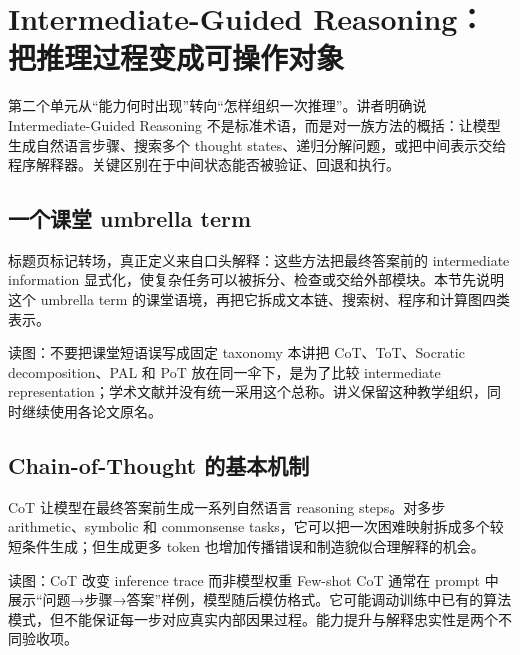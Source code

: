 \section{Intermediate-Guided Reasoning：把推理过程变成可操作对象}

第二个单元从“能力何时出现”转向“怎样组织一次推理”。讲者明确说 Intermediate-Guided Reasoning 不是标准术语，而是对一族方法的概括：让模型生成自然语言步骤、搜索多个 thought states、递归分解问题，或把中间表示交给程序解释器。关键区别在于中间状态能否被验证、回退和执行。

\subsection{一个课堂 umbrella term}

标题页标记转场，真正定义来自口头解释：这些方法把最终答案前的 intermediate information 显式化，使复杂任务可以被拆分、检查或交给外部模块。本节先说明这个 umbrella term 的课堂语境，再把它拆成文本链、搜索树、程序和计算图四类表示。


\begin{knowledgebox}{读图：不要把课堂短语误写成固定 taxonomy}
本讲把 CoT、ToT、Socratic decomposition、PAL 和 PoT 放在同一伞下，是为了比较 intermediate representation；学术文献并没有统一采用这个总称。讲义保留这种教学组织，同时继续使用各论文原名。
\end{knowledgebox}


\subsection{Chain-of-Thought 的基本机制}

CoT 让模型在最终答案前生成一系列自然语言 reasoning steps。对多步 arithmetic、symbolic 和 commonsense tasks，它可以把一次困难映射拆成多个较短条件生成；但生成更多 token 也增加传播错误和制造貌似合理解释的机会。


\begin{knowledgebox}{读图：CoT 改变 inference trace 而非模型权重}
Few-shot CoT 通常在 prompt 中展示“问题→步骤→答案”样例，模型随后模仿格式。它可能调动训练中已有的算法模式，但不能保证每一步对应真实内部因果过程。能力提升与解释忠实性是两个不同验收项。
\end{knowledgebox}

